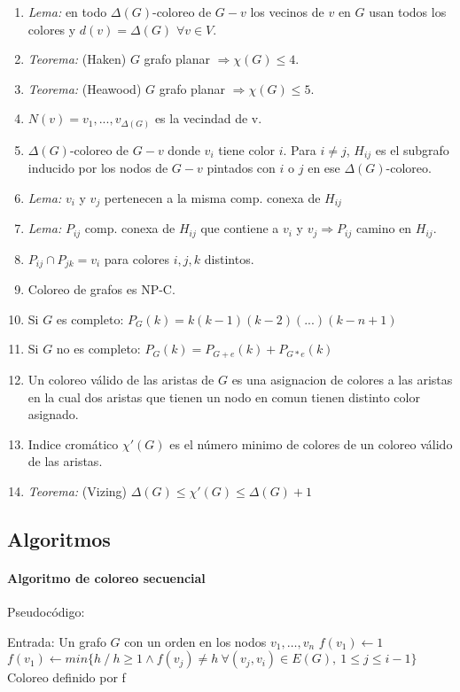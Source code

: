 \begin{enumerate}
\item \textit{Lema:} en todo $\Delta(G)$-coloreo de $G-{v}$ los vecinos de $v$ en $G$ usan todos los colores y $d(v) = \Delta(G)$ $\forall v \in V$.
\item \textit{Teorema:} (Haken) $G$ grafo planar $\Rightarrow \chi(G) \leq 4$.
\item \textit{Teorema:} (Heawood) $G$ grafo planar $\Rightarrow \chi(G) \leq 5$.
\item $N(v)={v_{1},...,v_{\Delta(G)}}$ es la vecindad de v.
\item $\Delta(G)$-coloreo de $G-{v}$ donde $v_{i}$ tiene color $i$. Para $i \neq j$, $H_{ij}$ es el subgrafo inducido por los nodos de $G-{v}$ pintados con $i$ o $j$ en ese $\Delta(G)$-coloreo.
\item \textit{Lema:} $v_{i}$ y $v_{j}$ pertenecen a la misma comp. conexa de $H_{ij}$
\item \textit{Lema:} $P_{ij}$ comp. conexa de $H_{ij}$ que contiene a $v_{i}$ y $v_{j} \Rightarrow P_{ij}$ camino en $H_{ij}$.
\item $P_{ij} \cap P_{jk} = {v_{i}}$ para colores $i,j,k$ distintos.
\item Coloreo de grafos es NP-C.
\item Si $G$ es completo: $P_{G}(k)= k(k-1)(k-2)(...)(k-n+1)$
\item Si $G$ no es completo: $P_{G}(k)= P_{G+e}(k) + P_{G*e}(k)$
\item Un coloreo válido de las aristas de $G$ es una asignacion de colores a las aristas en la cual dos aristas que tienen un nodo en comun tienen distinto color asignado.
\item Indice cromático $\chi'(G)$ es el número minimo de colores de un coloreo válido de las aristas.
\item \textit{Teorema:} (Vizing) $\Delta(G) \leq \chi'(G) \leq \Delta(G)+1$
\end{enumerate}

\subsection{Algoritmos}
\paragraph{Algoritmo de coloreo secuencial}

Pseudocódigo:
\begin{algorithmic}[1]
    \State Entrada: Un grafo $G$ con un orden en los nodos $v_1, \dots, v_n$
    \State $f(v_1) \gets 1$
        \State $f(v_1) \gets min\{h\ /\ h \geq 1 \land f(v_j) \neq h\ \forall(v_j,v_i) \in E(G),\ 1 \leq j \leq i-1 \}$
    \EndFor
    \State \Return Coloreo definido por f
\end{algorithmic}
